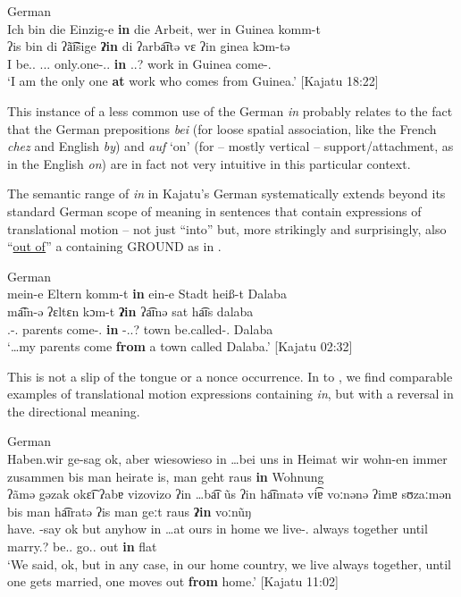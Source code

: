 \documentclass[output=paper]{langscibook}
\begin{document}
\begin{exe}
    \ex\label{fanego:ex:4} German \\
    \glll Ich bin die {Einzig-e} \textbf{in} die Arbeit, wer in Guinea komm-t \\
    ʔis	bin	di	{ʔã͡ɪ̃sige} \textbf{ʔin} di ʔarba͡ɪtə vɛ ʔin ginea kɔm-tə\\
    I be.\First\SG.\PRS{} \Def.\SG.\F.\NOM{} only.one-\SG.\F.\NOM{} \textbf{in} \Def.\F.\ACC? work \REL{} in Guinea come-\Third\SG.\PRS{} \\
    \glt ‘I am the only one \textbf{at} work who comes from Guinea.’ [Kajatu 18:22]
\end{exe}

\noindent
This instance of a less common use of the German \textit{in} probably relates to the fact that the German prepositions \textit{bei} (for loose spatial association, like the French \textit{chez} and English \textit{by}) and \textit{auf} ‘on’ (for – mostly vertical – support/attachment, as in the English \textit{on}) are in fact not very intuitive in this particular context. 

The semantic range of \textit{in} in Kajatu’s German systematically extends beyond its standard German scope of meaning in sentences that contain expressions of translational motion – not just “into” but, more strikingly and surprisingly, also “\ul{out of}” a containing GROUND as in .

\ea\label{fanego:ex:5} German \\
    \glll mein-e Eltern komm-t \textbf{in} ein-e Stadt heiß-t Dalaba \\
    ma͡in-ə ʔɛltɛn kɔm-t \textbf{ʔin} ʔa͡ɪnə sat ha͡ɪs dalaba \\
    \First\SG.\POSS-\PL.\NOM{} parents come-\Third\SG.\PRS{} \textbf{in} \INDF-\SG.\F.\ACC? town be.called-\Third\SG.\PRS{} Dalaba \\
    \glt ‘\dots my parents come \textbf{from} a town called Dalaba.’ [Kajatu 02:32]
\z


\noindent
This is not a slip of the tongue or a nonce occurrence. In  to , we find comparable examples of translational motion expressions containing \textit{in}, but with a reversal in the directional meaning.

\begin{exe}
    \ex\label{fanego:ex:6} German \\
    \glll Haben.wir ge-sag ok, aber wiesowieso in \dots bei uns in Heimat wir wohn-en immer zusammen bis man heirate is, man geht raus \textbf{in} Wohnung \\
    ʔãmə gəzak okɛ͡ɪ ʔabɐ vizovizo ʔin \dots ba͡ɪ ũs ʔin ha͡ɪmatə vi͡ɐ voːnənə ʔimɐ sʊzaːmən bis man ha͡ɪratə ʔis man geːt raus \textbf{ʔin} voːnũŋ \\
    have.\First\PL{} \PTCP-say ok but anyhow in \dots at ours in home we live-\First\PL.\PRS{} always together until \INDF{} marry.\PTCP? be.\Third\SG.\PRS{} \INDF{} go.\Third\SG.\PRS{} out \textbf{in} flat \\
    \glt ‘We said, ok, but in any case, in our home country, we live always together, until one gets married, one moves out \textbf{from} home.’ [Kajatu 11:02]
\end{exe}
\end{document}
